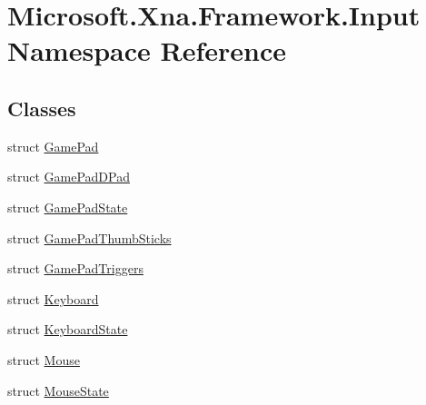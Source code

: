 \hypertarget{namespace_microsoft_1_1_xna_1_1_framework_1_1_input}{}\section{Microsoft.\+Xna.\+Framework.\+Input Namespace Reference}
\label{namespace_microsoft_1_1_xna_1_1_framework_1_1_input}
\subsection*{Classes}
\begin{DoxyCompactItemize}
\item 
struct \hyperlink{struct_microsoft_1_1_xna_1_1_framework_1_1_input_1_1_game_pad}{Game\+Pad}
\item 
struct \hyperlink{struct_microsoft_1_1_xna_1_1_framework_1_1_input_1_1_game_pad_d_pad}{Game\+Pad\+D\+Pad}
\item 
struct \hyperlink{struct_microsoft_1_1_xna_1_1_framework_1_1_input_1_1_game_pad_state}{Game\+Pad\+State}
\item 
struct \hyperlink{struct_microsoft_1_1_xna_1_1_framework_1_1_input_1_1_game_pad_thumb_sticks}{Game\+Pad\+Thumb\+Sticks}
\item 
struct \hyperlink{struct_microsoft_1_1_xna_1_1_framework_1_1_input_1_1_game_pad_triggers}{Game\+Pad\+Triggers}
\item 
struct \hyperlink{struct_microsoft_1_1_xna_1_1_framework_1_1_input_1_1_keyboard}{Keyboard}
\item 
struct \hyperlink{struct_microsoft_1_1_xna_1_1_framework_1_1_input_1_1_keyboard_state}{Keyboard\+State}
\item 
struct \hyperlink{struct_microsoft_1_1_xna_1_1_framework_1_1_input_1_1_mouse}{Mouse}
\item 
struct \hyperlink{struct_microsoft_1_1_xna_1_1_framework_1_1_input_1_1_mouse_state}{Mouse\+State}
\end{DoxyCompactItemize}
